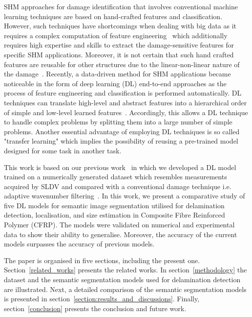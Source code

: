 SHM approaches for damage identification that involves conventional machine learning techniques are based on hand-crafted features and classification.
However, such techniques have shortcomings when dealing with big data as it requires a complex computation of feature engineering~\cite{Gulgec2019} which additionally requires high expertise and skills to extract the damage-sensitive features for specific SHM applications.
Moreover, it is not certain that such hand crafted features are reusable for
other structures due to the linear-non-linear nature of the damage~\cite{Adams2002}.
Recently, a data-driven method for SHM applications became noticeable in the form of deep learning (DL) end-to-end approaches as the process of feature engineering and classification is performed automatically.
DL techniques can translate high-level and abstract features into a hierarchical order of simple and low-level learned features~\cite{Goodfellow-et-al-2016}.
Accordingly, this allows a DL technique to handle complex problems by splitting them into a large number of simple problems.
Another essential advantage of employing DL techniques is so called "transfer learning" which implies the possibility of reusing a pre-trained model designed for some task in another task.

This work is based on our previous work~\cite{Ijjeh2021} in which we developed a DL model trained on a numerically generated dataset which resembles measurements acquired by SLDV and compared with a conventional damage technique i.e. adaptive wavenumber filtering~\cite{Kudela2015, Radzienski2019a}.
In this work, we present a comparative study of five DL models for semantic image segmentation utilised for delamination detection, localisation, and size estimation in Composite Fibre Reinforced Polymer (CFRP).
The models were validated on numerical and experimental data to show their ability to generalise.
Moreover, the accuracy of the current models surpasses the accuracy of previous models.         

The paper is organised in five sections, including the present one.
Section~\ref{related_works} presents the related works.
In section~\ref{methodology} the dataset and the semantic segmentation models used for delamination detection are illustrated. 
Next, a detailed comparison of the semantic segmentation models is presented in section~\ref{section:results_and_discussions}.
Finally, section~\ref{conclusion} presents the conclusion and future work.